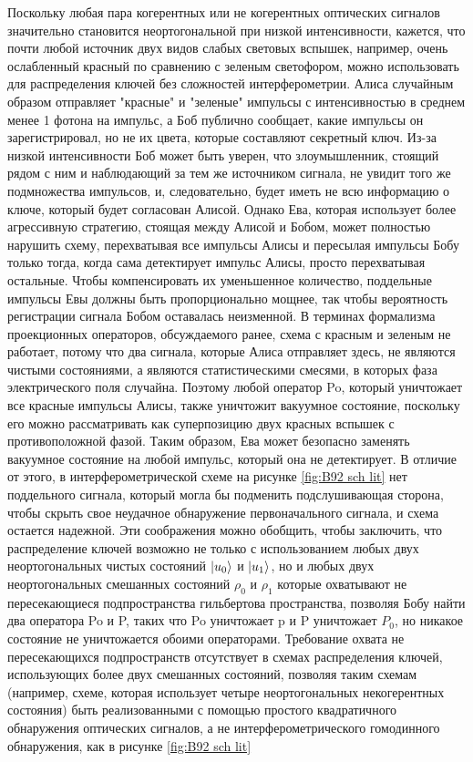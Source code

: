 Поскольку любая пара когерентных или не когерентных оптических сигналов значительно становится неортогональной при низкой интенсивности, кажется, что почти любой источник двух видов слабых световых вспышек, например, очень ослабленный красный по сравнению с зеленым светофором, можно использовать для распределения ключей без сложностей интерферометрии. Алиса случайным образом отправляет "красные" и "зеленые" импульсы с интенсивностью в среднем менее 1 фотона на импульс, а Боб публично сообщает, какие импульсы он зарегистрировал, но не их цвета, которые составляют секретный ключ. Из-за низкой интенсивности Боб может быть уверен, что злоумышленник, стоящий рядом с ним и наблюдающий за тем же источником сигнала, не увидит того же подмножества импульсов, и, следовательно, будет иметь не всю информацию о ключе, который будет согласован  Алисой. 
Однако Ева, которая использует более агрессивную стратегию, стоящая между Алисой и Бобом, может полностью нарушить схему, перехватывая все импульсы Алисы и пересылая импульсы Бобу только тогда, когда сама детектирует импульс Алисы, просто перехватывая остальные. Чтобы компенсировать их уменьшенное количество, поддельные импульсы Евы должны быть пропорционально мощнее, так чтобы вероятность регистрации сигнала  Бобом оставалась неизменной. В терминах формализма проекционных операторов, обсуждаемого ранее, схема с красным и зеленым не работает, потому что два сигнала, которые Алиса отправляет здесь, не являются чистыми состояниями, а являются статистическими смесями, в которых фаза электрического поля случайна. Поэтому любой оператор Po, который уничтожает все красные импульсы Алисы, также уничтожит вакуумное состояние, поскольку его можно рассматривать как суперпозицию двух красных вспышек с противоположной фазой. Таким образом, Ева может безопасно заменять вакуумное состояние на любой импульс, который она не детектирует. В отличие от этого, в интерферометрической схеме на рисунке \ref{fig:B92 sch lit} нет поддельного сигнала, который могла бы подменить подслушивающая сторона, чтобы скрыть свое неудачное обнаружение первоначального сигнала, и схема остается надежной. Эти соображения можно обобщить, чтобы заключить, что распределение ключей возможно не только с использованием любых двух неортогональных чистых состояний $\lvert u_0\rangle$ и $\lvert u_1\rangle$, но и любых двух неортогональных смешанных состояний $\rho_0 $ и $\rho_1$ которые охватывают не пересекающиеся подпространства гильбертова пространства, позволяя Бобу найти два оператора Po и P, таких что Po уничтожает p и P уничтожает $P_0$, но никакое состояние не уничтожается обоими операторами. Требование охвата не пересекающихся подпространств отсутствует в схемах распределения ключей, использующих более двух смешанных состояний, позволяя таким схемам (например, схеме, которая использует четыре неортогональных некогерентных состояния) быть реализованными с помощью простого квадратичного обнаружения оптических сигналов, а не интерферометрического гомодинного обнаружения, как в рисунке \ref{fig:B92 sch lit}


